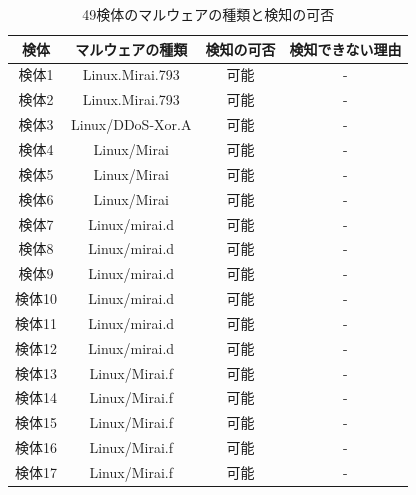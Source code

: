 \begin{small}
\begin{flushleft}
\begin{longtable}{|c|c|c|c|}
    \caption{49検体のマルウェアの種類と検知の可否}
    \label{tab:malware} \\
    \hline
    検体   & マルウェアの種類             & 検知の可否 & 検知できない理由                      \\ \hline
    \endhead
        検体1  & Linux.Mirai.793      & 可能    & -                             \\ \hline
        検体2  & Linux.Mirai.793      & 可能    & -                             \\ \hline
        検体3  & Linux/DDoS-Xor.A     & 可能    & -                             \\ \hline
        検体4  & Linux/Mirai          & 可能    & -                             \\ \hline
        検体5  & Linux/Mirai          & 可能    & -                             \\ \hline
        検体6  & Linux/Mirai          & 可能    & -                             \\ \hline
        検体7  & Linux/mirai.d        & 可能    & -                             \\ \hline
        検体8  & Linux/mirai.d        & 可能    & -                             \\ \hline
        検体9  & Linux/mirai.d        & 可能    & -                             \\ \hline
        検体10 & Linux/mirai.d        & 可能    & -                             \\ \hline
        検体11 & Linux/mirai.d        & 可能    & -                             \\ \hline
        検体12 & Linux/mirai.d        & 可能    & -                             \\ \hline
        検体13 & Linux/Mirai.f        & 可能    & -                             \\ \hline
        検体14 & Linux/Mirai.f        & 可能    & -                             \\ \hline
        検体15 & Linux/Mirai.f        & 可能    & -                             \\ \hline
        検体16 & Linux/Mirai.f        & 可能    & -                             \\ \hline
        検体17 & Linux/Mirai.f        & 可能    & -                             \\ \hline

\end{longtable}
\end{flushleft}
\end{small}
